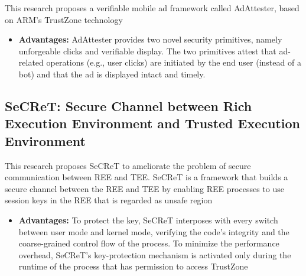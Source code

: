 \documentclass[conference]{IEEEtran}
\begin{document}
\cite{misc8} This research proposes a verifiable mobile ad framework called AdAttester, based on ARM’s TrustZone technology
\begin{itemize}
    \item \textbf{Advantages:} AdAttester provides two novel security primitives, namely unforgeable clicks and verifiable display. The two primitives attest that ad-related operations (e.g., user clicks) are initiated by the end user (instead of a bot) and that the ad is displayed intact and timely.
\end{itemize}


\subsection{SeCReT: Secure Channel between Rich Execution Environment and Trusted Execution Environment}

\cite{misc9} This research proposes SeCReT to ameliorate the problem of secure communication between REE and TEE. SeCReT is a framework that builds a secure channel between the REE and TEE by enabling REE processes to use session keys in the REE that is regarded as unsafe region
\begin{itemize}
    \item \textbf{Advantages:} To protect the key, SeCReT interposes with every switch between user mode and kernel mode, verifying the code’s integrity and the coarse-grained control flow of the process. To minimize the performance overhead, SeCReT’s key-protection mechanism is activated only during the runtime of the process that has permission to access TrustZone
\end{itemize}
\end{document}
